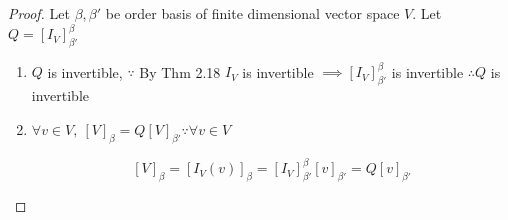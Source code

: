 \begin{proof}
	Let $\beta,\beta'$ be order basis of finite dimensional vector space $V$. Let $Q = [I_V]^{\beta}_{\beta'}$
	
	\begin{enumerate}
		\item $Q$ is invertible, $\because$ By Thm 2.18 $I_V$ is invertible $\implies [I_V]^{\beta}_{\beta'}$ is invertible $\therefore Q$ is invertible
		\item $\forall v \in V,~ [V]_{\beta} = Q [V]_{\beta'} \because \forall v \in V$
		
		$$[V]_{\beta} = [I_V(v)]_{\beta} = [I_V]^{\beta}_{\beta'}[v]_{\beta'} = Q[v]_{\beta'}$$
	\end{enumerate}
\end{proof}
